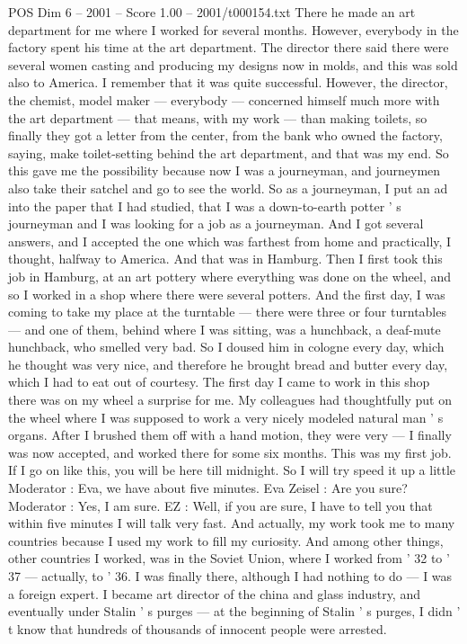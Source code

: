 \begin{textsample}{POS Dim 6 – 2001 – Score 1.00 – 2001/t000154.txt}
There he made an art department for me where I worked for several months.
However, everybody in the factory spent his time at the art department.
The director there said there were several women casting and producing my designs now in molds, and this was sold also to America.
I remember that it was quite successful.
However, the director, the chemist, model maker — everybody — concerned himself much more with the art department — that means, with my work — than making toilets, so finally they got a letter from the center, from the bank who owned the factory, saying, make toilet-setting behind the art department, and that was my end.
So this gave me the possibility because now I was a journeyman, and journeymen also take their satchel and go to see the world.
So as a journeyman, I put an ad into the paper that I had studied, that I was a down-to-earth potter ' s journeyman and I was looking for a job as a journeyman.
And I got several answers, and I accepted the one which was farthest from home and practically, I thought, halfway to America.
And that was in Hamburg.
Then I first took this job in Hamburg, at an art pottery where everything was done on the wheel, and so I worked in a shop where there were several potters.
And the first day, I was coming to take my place at the turntable — there were three or four turntables — and one of them, behind where I was sitting, was a hunchback, a deaf-mute hunchback, who smelled very bad.
So I doused him in cologne every day, which he thought was very nice, and therefore he brought bread and butter every day, which I had to eat out of courtesy.
The first day I came to work in this shop there was on my wheel a surprise for me.
My colleagues had thoughtfully put on the wheel where I was supposed to work a very nicely modeled natural man ' s organs.
After I brushed them off with a hand motion, they were very — I finally was now accepted, and worked there for some six months.
This was my first job.
If I go on like this, you will be here till midnight.
So I will try speed it up a little Moderator : Eva, we have about five minutes.
Eva Zeisel : Are you sure?
Moderator : Yes, I am sure.
EZ : Well, if you are sure, I have to tell you that within five minutes I will talk very fast.
And actually, my work took me to many countries because I used my work to fill my curiosity.
And among other things, other countries I worked, was in the Soviet Union, where I worked from ' 32 to ' 37 — actually, to ' 36.
I was finally there, although I had nothing to do — I was a foreign expert.
I became art director of the china and glass industry, and eventually under Stalin ' s purges — at the beginning of Stalin ' s purges, I didn ' t know that hundreds of thousands of innocent people were arrested.

\end{textsample}
